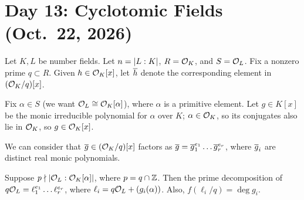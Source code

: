 \section{Day 13: Cyclotomic Fields (Oct.\ 22, 2026)}
Let $K, L$ be number fields. Let $n = \left\lvert L : K \right\rvert$, $R = \mathcal O_K$, and $S = \mathcal O_L$. Fix a nonzero prime $q \subset R$. Given $h \in \mathcal O_K[x]$, let $\overline h$ denote the corresponding element in $(\mathcal O_K/q)[x]$. 

Fix $\alpha \in S$ (we want $\mathcal O_L \cong \mathcal O_K[\alpha]$), where $\alpha$ is a primitive element. Let $g \in K[x]$ be the monic irreducible polynomial for $\alpha$ over $K$; $\alpha \in \mathcal O_K$, so its conjugates also lie in $\mathcal O_K$, so $g \in \mathcal O_K[x]$.

We can consider that $\overline g \in (\mathcal O_K/q)[x]$ factors as $\overline g = \overline g_1^{e_1} \dots \overline g_r^{e_r}$, where $\overline g_i$ are distinct real monic polynomials.

\begin{theorem} \label{thm:factoring_polynomials}
    Suppose $p \nmid \left\lvert \mathcal O_L : \mathcal O_K[\alpha] \right\rvert$, where $p = q \cap \mathbb Z$. Then the prime decomposition of $q \mathcal O_L = \ell_1^{e_1} \dots \ell_r^{e_r}$, where $\ell_i = q \mathcal O_L + (g_i(\alpha))$. Also, $f(\ell_i / q) = \deg g_i$.
\end{theorem}

